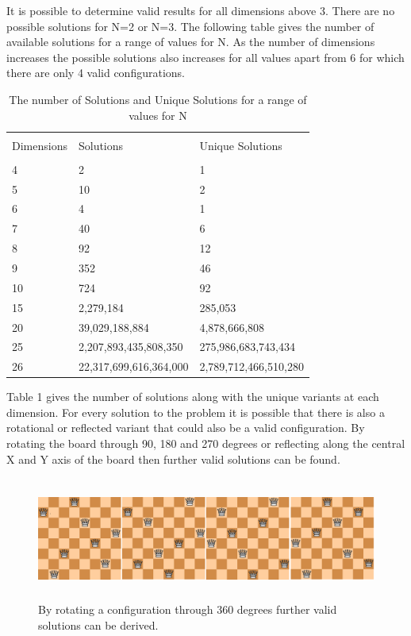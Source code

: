 \documentclass[a4paper,onecolumn,11pt]{article}
\begin{document}
It is possible to determine valid results for all dimensions above 3. There are no possible solutions for N=2 or N=3. The following table gives the number of available solutions for a range of values for N. As the number of dimensions increases the possible solutions also increases for all values apart from 6 for which there are only 4 valid configurations. 

\begin{table}[ht]
\begin{tabular}{|p{2cm}|p{6cm}|p{6cm}|} 
		\hline\\
		Dimensions & Solutions & Unique Solutions \\
		\hline\\
		4 & 2 & 1 \\ 
		5 & 10 & 2 \\
		6 & 4 & 1 \\
		7 & 40 & 6 \\
		8 & 92 & 12 \\
		9 & 352 & 46 \\
		10 & 724 & 92 \\
		15 & 2,279,184 & 285,053 \\
		20 & 39,029,188,884 & 4,878,666,808 \\
		25 & 2,207,893,435,808,350  & 275,986,683,743,434 \\
		26 & 22,317,699,616,364,000 & 2,789,712,466,510,280 \\
		\hline
	\end{tabular}
	\caption{The number of Solutions and Unique Solutions for a range of values for N}
\end{table}

Table 1 gives the number of solutions along with the unique variants at each dimension. For every solution to the problem it is possible that there is also a rotational or reflected variant that could also be a valid configuration. By rotating the board through 90, 180 and 270 degrees or reflecting along the central X and Y axis of the board then further valid solutions can be found.

\begin{figure}[!htbp]
	\centering	
	\includegraphics[width=16cm, height=4cm]{NQueensRotations}
	\caption{By rotating a configuration through 360 degrees further valid solutions can be derived.}
\end{figure}
\end{document}
